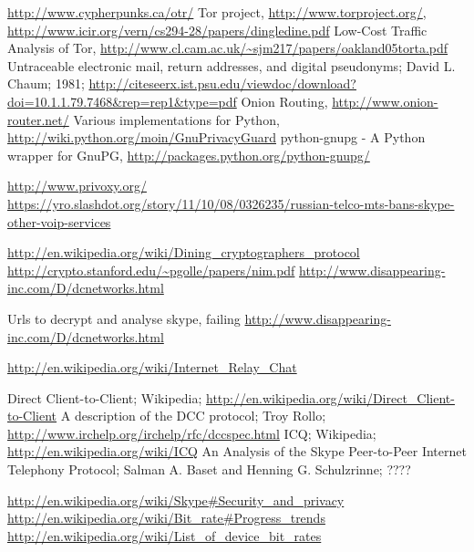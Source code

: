 \begin{thebibliography}{666}
 \url{http://www.cypherpunks.ca/otr/}
 Tor project, \url{http://www.torproject.org/},
    \url{http://www.icir.org/vern/cs294-28/papers/dingledine.pdf}
 Low-Cost Traffic Analysis of Tor,
    \url{http://www.cl.cam.ac.uk/~sjm217/papers/oakland05torta.pdf}
 Untraceable electronic mail, return addresses, and digital pseudonyms;
    David L. Chaum; 1981;
    \url{http://citeseerx.ist.psu.edu/viewdoc/download?doi=10.1.1.79.7468&rep=rep1&type=pdf}
 Onion Routing, \url{http://www.onion-router.net/}
 Various implementations for Python,
    \url{http://wiki.python.org/moin/GnuPrivacyGuard}
 python-gnupg - A Python wrapper for GnuPG,
    \url{http://packages.python.org/python-gnupg/}

 \url{http://www.privoxy.org/}
\url{https://yro.slashdot.org/story/11/10/08/0326235/russian-telco-mts-bans-skype-other-voip-services}

\url{http://en.wikipedia.org/wiki/Dining_cryptographers_protocol}
\url{http://crypto.stanford.edu/~pgolle/papers/nim.pdf}
\url{http://www.disappearing-inc.com/D/dcnetworks.html}

 Urls to decrypt and analyse skype, failing
\url{http://www.disappearing-inc.com/D/dcnetworks.html}

 \url{http://en.wikipedia.org/wiki/Internet_Relay_Chat}

 Direct Client-to-Client; Wikipedia;
    \url{http://en.wikipedia.org/wiki/Direct_Client-to-Client}
 A description of the DCC protocol; Troy Rollo;
    \url{http://www.irchelp.org/irchelp/rfc/dccspec.html}
 ICQ; Wikipedia;
    \url{http://en.wikipedia.org/wiki/ICQ}
 An Analysis of the Skype Peer-to-Peer Internet
Telephony Protocol;
Salman A. Baset and Henning G. Schulzrinne;
????

 \url{http://en.wikipedia.org/wiki/Skype#Security_and_privacy}
 \url{http://en.wikipedia.org/wiki/Bit_rate#Progress_trends}
 \url{http://en.wikipedia.org/wiki/List_of_device_bit_rates}


\end{thebibliography}

